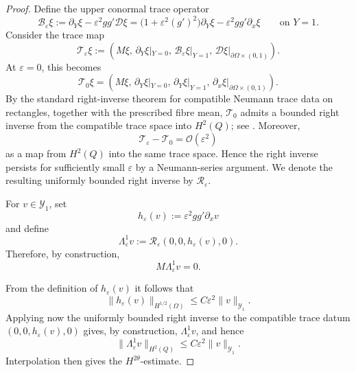 \documentclass[11pt]{article}
\theoremstyle{definition}
\theoremstyle{remark}
\numberwithin{equation}{section}
\newcommand{\mc}[1]{\mathcal{#1}}
\begin{document}
\begin{proof}
Define the upper conormal trace operator
\[
\mathcal B_\varepsilon \xi
:=
\partial_Y\xi-\varepsilon^2gg'\mathcal D\xi
=
\bigl(1+\varepsilon^2(g')^2\bigr)\partial_Y\xi
-
\varepsilon^2gg'\partial_x\xi
\qquad\text{on }Y=1.
\]
Consider the trace map
\[
\mathcal T_\varepsilon \xi
:=
\left(
M\xi,\,
\partial_Y\xi|_{Y=0},\,
\mathcal B_\varepsilon\xi|_{Y=1},\,
\mathcal D\xi|_{\partial\Omega\times(0,1)}
\right).
\]
At \(\varepsilon=0\), this becomes
\[
\mathcal T_0\xi
=
\left(
M\xi,\,
\partial_Y\xi|_{Y=0},\,
\partial_Y\xi|_{Y=1},\,
\partial_x\xi|_{\partial\Omega\times(0,1)}
\right).
\]
By the standard right-inverse theorem for compatible Neumann trace data on
rectangles, together with the prescribed fibre mean,
\(\mathcal T_0\) admits a bounded right inverse from the compatible trace space
into \(H^2(Q)\); see \cite{Grisvard1985,McLean2000}.
Moreover,
\[
\mathcal T_\varepsilon-\mathcal T_0
=
\mathcal O(\varepsilon^2)
\]
as a map from \(H^2(Q)\) into the same trace space. Hence the right inverse
persists for sufficiently small \(\varepsilon\) by a Neumann-series argument.
We denote the resulting uniformly bounded right inverse by
\(\mathcal R_\varepsilon\).

For \(v\in\mc Y_1\), set
\[
h_\varepsilon(v):=\varepsilon^2gg'\partial_xv
\]
and define
\[
\Lambda_\varepsilon^1v
:=
\mathcal R_\varepsilon(0,0,h_\varepsilon(v),0).
\]
Therefore, by construction,
\[
M\Lambda_\varepsilon^1v=0.
\]

From the definition of $h_\varepsilon(v)$ it follows that
\[
\|h_\varepsilon(v)\|_{H^{1/2}(\Omega)}
\le
C\varepsilon^2\|v\|_{\mathcal Y_1}.
\]
Applying now the uniformly bounded right inverse to the compatible trace datum $(0,0,h_\varepsilon(v),0)$
gives, by construction, \(\Lambda_\varepsilon^1v\), and hence
\[
\|\Lambda_\varepsilon^1v\|_{H^2(Q)}
\le
C\varepsilon^2\|v\|_{\mathcal Y_1}.
\]
Interpolation then gives the \(H^{2\theta}\)-estimate. 


\end{proof}
\end{document}

